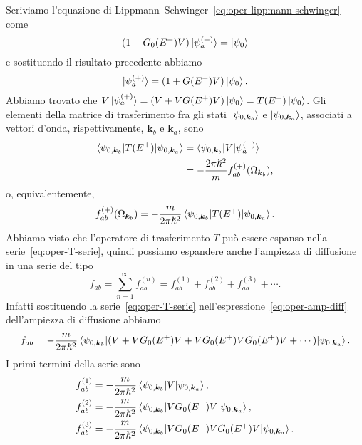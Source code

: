 \documentclass[a4paper,fleqn,twoside,12pt]{article}
\begin{document}
Scriviamo l'equazione di Lippmann–Schwinger~\eqref{eq:oper-lippmann-schwinger}
come
\begin{equation}
  (1 - G_{0}(E^{+})V)\ket{\psi_{a}^{(+)}} = \ket{\psi_{0}}
\end{equation}
e sostituendo il risultato precedente abbiamo
\begin{equation}
  \label{eq:foobaz}
  \ket{\psi_{a}^{(+)}} = (1 + G(E^{+})V)\ket{\psi_{0}}.
\end{equation}
Abbiamo trovato che
$V\ket{\psi_{a}^{(+)}} = (V + VG(E^{+})V)\ket{\psi_{0}} =
T(E^{+})\ket{\psi_{0}}$. Gli elementi della matrice di trasferimento fra gli
stati $\ket{\psi_{0,\bm{k}_{b}}}$ e $\ket{\psi_{0,\bm{k}_{a}}}$, associati a
vettori d'onda, rispettivamente, $\bm{k}_{b}$ e $\bm{k}_{a}$, sono
\begin{equation}
  \label{eq:oper-T-amp}
  \begin{split}
    \braket{\psi_{0,\bm{k}_{b}} | T(E^{+}) | \psi_{0,\bm{k}_{a}}} &=
    \braket{\psi_{0,\bm{k}_{b}} | V | \psi_{a}^{(+)}} \\
    &= -\frac{2\pi\hslash^{2}}{m} f_{ab}^{(+)}(\Omega_{\bm{k}_{b}}),
  \end{split}
\end{equation}
o, equivalentemente,
\begin{equation}
  \label{eq:oper-amp-diff}
  f_{ab}^{(+)}(\Omega_{\bm{k}_{b}}) = -\frac{m}{2\pi\hslash^{2}}
  \braket{\psi_{0,\bm{k}_{b}} | T(E^{+}) | \psi_{0,\bm{k}_{a}}}.
\end{equation}
Abbiamo visto che l'operatore di trasferimento $T$ può essere espanso nella
serie~\eqref{eq:oper-T-serie}, quindi possiamo espandere anche l'ampiezza di
diffusione in una serie del tipo
\begin{equation}
  f_{ab} = \sum_{n = 1}^{\infty} f_{ab}^{(n)} = f_{ab}^{(1)} + f_{ab}^{(2)} +
  f_{ab}^{(3)} + \cdots.
\end{equation}
Infatti sostituendo la serie~\eqref{eq:oper-T-serie}
nell'espressione~\eqref{eq:oper-amp-diff} dell'ampiezza di diffusione abbiamo
\begin{equation}
  f_{ab} = -\frac{m}{2\pi\hslash^{2}} \braket{\psi_{0,\bm{k}_{b}} | (V +
    VG_{0}(E^{+})V + VG_{0}(E^{+})VG_{0}(E^{+})V + \cdots) |
    \psi_{0,\bm{k}_{a}}}.
\end{equation}
I primi termini della serie sono
\begin{subequations}
  \begin{align}
    f_{ab}^{(1)} &= -\frac{m}{2\pi\hslash^{2}}
    \braket{\psi_{0,\bm{k}_{b}} | V | \psi_{0,\bm{k}_{a}}}, \\
    \label{eq:ampiezza-born2-braket}
    f_{ab}^{(2)} &= -\frac{m}{2\pi\hslash^{2}} \braket{\psi_{0,\bm{k}_{b}} |
      VG_{0}(E^{+})V | \psi_{0,\bm{k}_{a}}}, \\
    f_{ab}^{(3)} &= -\frac{m}{2\pi\hslash^{2}} \braket{\psi_{0,\bm{k}_{b}} |
      VG_{0}(E^{+})VG_{0}(E^{+})V | \psi_{0,\bm{k}_{a}}}.
  \end{align}
\end{subequations}
\end{document}
